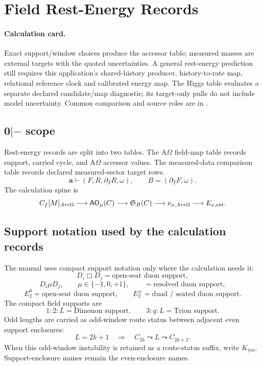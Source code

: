 \section{Field Rest-Energy Records}\label{manual:rest-energy-prediction}

\paragraph{Calculation card.}
Exact support/window choices produce the accessor table; measured masses
are external targets with the quoted uncertainties. A general rest-energy
prediction still requires this application's shared-history producer,
history-to-rate map, relational reference clock and calibrated energy map.
The Higgs table evaluates a separate declared candidate/map diagnostic;
its target-only pulls do not include model uncertainty. Common comparison
and source roles are in .



\subsection{0\texorpdfstring{$|-$}{|-} scope}\label{manual:rest:scope}
Rest-energy records are split into two tables. The A\(\Omega\) field-map table records support, carried cycle, and A\(\Omega\) accessor values. The measured-data comparison table records declared measured-sector target rows.
\[
\mathbf a\vdash(F,R,\partial_T R,\omega),
\qquad
B=(\partial_TF,\omega).
\]
The calculation spine is
\[
C_f[M]_{A{\leftrightarrow}\Omega}
\longrightarrow
\mathsf{AO}_{\mu}(C)
\longrightarrow
\mathfrak S_B(C)
\longrightarrow
\nu_{x,A{\leftrightarrow}\Omega}
\longrightarrow
E_{x,\mathrm{ext}}.
\]


\subsection{Support notation used by the calculation records}\label{manual:rest:support-notation}
The manual uses compact support notation only where the calculation needs it:
\[
D_i\Box D_j=\text{open-seat duon support},
\]
\[
D_i\mu D_j,
\qquad
\mu\in\{-1,0,+1\},
\qquad
=\text{resolved duon support},
\]
\[
E_2^0=\text{open-seat duon support},
\qquad
E_2^\pm=\text{duad / seated duon support}.
\]
The compact field supports are
\[
1{:}2{:}L=\text{Dimonon support},
\qquad
3{:}q{:}L=\text{Trion support}.
\]
Odd lengths are carried as odd-window route status between adjacent even support enclosures:
\[
L=2k+1
\quad\Rightarrow\quad
C_{2k}\leadsto L\leadsto C_{2k+2}.
\]
When this odd-window instability is retained as a route-status suffix, write \(K_{\mathrm{yro}}\). Support-enclosure names remain the even-enclosure names.


